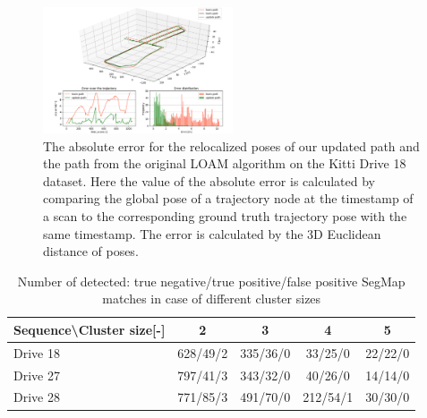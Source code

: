 \documentclass[letterpaper, 10 pt, conference]{ieeeconf}  %
\begin{document}
\begin{figure}[!t]
\centerline{\includegraphics[width=0.5\textwidth]{figures/full_evaluate_18.png}}\par
\caption{The absolute error for the relocalized poses of our updated path and the path from the original LOAM algorithm on the Kitti Drive 18 dataset. Here the value of the absolute error is calculated by comparing the global pose of a trajectory node at the timestamp of a scan to the corresponding ground truth trajectory pose with the same timestamp. The error is calculated by the 3D Euclidean distance of poses.}
\label{fig:abs_error}
\end{figure}


\begin{table}[!t]
\centering
\caption{%
Number of detected: true negative/true positive/false positive SegMap matches in case of different cluster sizes
}
\begin{tabular}{|l|c|c|c|c|}
\hline
Sequence\textbackslash Cluster size[-] & 2 & 3 & 4 & 5\\
\hline
Drive 18 & 628/49/2 &335/36/0 & 33/25/0 &22/22/0\\
Drive 27& 797/41/3 & 343/32/0 & 40/26/0 & 14/14/0\\
Drive 28 & 771/85/3& 491/70/0 & 212/54/1 &30/30/0\\
\hline
\end{tabular}
\label{tab:ransac_table}
\end{table}
\end{document}
